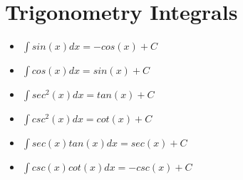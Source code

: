 \documentclass[12pt]{article}
\begin{document}
\section{Trigonometry Integrals}
\begin{itemize}
    \item $\int sin(x) dx = -cos(x)+C$
    \item $\int cos(x) dx = sin(x)+C$
    \item $\int sec^{2}(x)dx = tan(x)+C$
    \item $\int csc^{2}(x)dx = cot(x)+C$
    \item $\int sec(x)tan(x) dx = sec(x)+C$
    \item $\int csc(x)cot(x) dx = -csc(x) + C $
\end{itemize}
\end{document}
